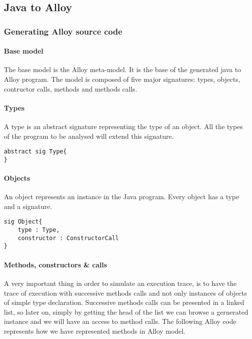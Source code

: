 \subsection{Java to Alloy}
\subsubsection{Generating Alloy source code}
\paragraph{Base model}
The base model is the Alloy meta-model. It is the base of the generated java to Alloy program. The model is composed of five major signatures: types, objects, contructor calls, methods and methods calls.

\lstset{language=Alloy}

\paragraph{Types} A type is an abstract signature representing the type of an object. All the types of the program to be analysed will extend this signature.\\

\begin{lstlisting}
abstract sig Type{
}
\end{lstlisting}

\paragraph{Objects} An object represents an instance in the Java program. Every object has a type and a signature.\\

\begin{lstlisting}
sig Object{
    type : Type,
    constructor : ConstructorCall
}
\end{lstlisting}

\paragraph{Methods, constructors \& calls} A very important thing in order  to simulate an execution trace, is to have the trace of execution with successive methods calls and not only instances of objects of simple type declaration. Successive methods calls can be presented in a linked list, so later on, simply by getting the head of the list we can browse a gernerated instance and we will have an access to method calls. The following Alloy code represents how we have represented methods in Alloy model.\\

